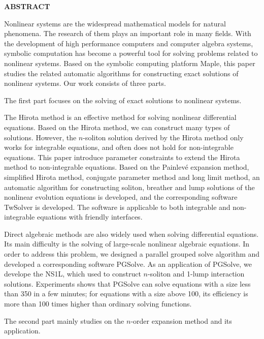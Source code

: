 {}
\centerline{\bfseries ABSTRACT}

\linespread{1.4}
\bigskip

Nonlinear systems are the widespread mathematical models for natural phenomena. The research of them plays an important role in many fields. With the development of high performance computers and computer algebra systems, symbolic computation has become a powerful tool for solving problems related to nonlinear systems. Based on the symbolic computing platform Maple, this paper studies the related automatic algorithms for constructing exact solutions of nonlinear systems. Our work consists of three parts.

The first part focuses on the solving of exact solutions to nonlinear systems.

The Hirota method is an effective method for solving nonlinear differential equations. Based on the Hirota method, we can construct many types of solutions. However, the $n$-soliton solution derived by the Hirota method  only works for integrable equations, and often does not hold for non-integrable equations. This paper introduce parameter constraints to extend the Hirota method to  non-integrable equations. Based on the Painlevé expansion method, simplified Hirota method, conjugate parameter method and long limit method, an automatic algorithm for constructing soliton, breather and lump solutions of the nonlinear evolution equations is developed, and the corresponding software TwSolver is developed. The software is applicable to both integrable and non-integrable equations with friendly interfaces. 

Direct algebraic methods are also widely used when solving differential equations. Its main difficulty is the solving of large-scale nonlinear algebraic equations. In order to address this problem, we designed a parallel grouped solve algorithm and developed a corresponding software PGSolve. As an application of PGSolve, we develope  the NS1L,  which used to construct $n$-soliton and 1-lump interaction solutions. Experiments shows that PGSolve can solve equations with a size less than 350 in a few minutes; for equations with a size above 100, its efficiency is more than 100 times higher than ordinary solving functions.

The second part mainly studies on the $n$-order expansion method and its application.

